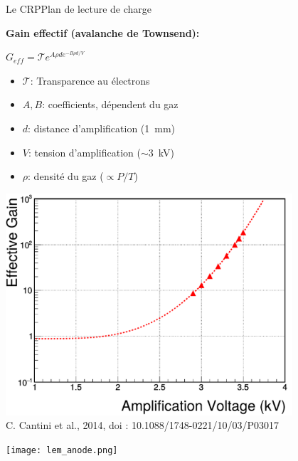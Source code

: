     \begin{frame}{Le CRP}{Plan de lecture de charge}
   		\begin{minipage}{0.43\textwidth}
   			\begin{scriptsize}
	   			\textbf{Gain effectif (avalanche de Townsend):}\\
	   		\end{scriptsize}
   			$G_{eff} = \mathcal{T}e^{A\rho d e^{-B\rho d/V}}$\\
   			\begin{scriptsize}
    			\begin{itemize}
    				\item $\mathcal{T}$: Transparence au électrons
    				\item $A,B$: coefficients, dépendent du gaz
    				\item $d$: distance d'amplification (\SI{1}{\milli\meter})
    				\item $V$: tension d'amplification ($\sim$\SI{3}{\kilo\volt})
    				\item $\rho$: densité du gaz ($\propto P/T$)
    			\end{itemize}
    		\end{scriptsize} 
   			\vfill\centering\includegraphics[width=0.8\textwidth]{./pictures/gain_3L.pdf}\\\tiny{C. Cantini et al., 2014, doi : 10.1088/1748-0221/10/03/P03017}
   		\end{minipage}\hfill
   		\begin{minipage}{0.52\textwidth}
   			\texttt{[image: lem\_anode.png]}
   		\end{minipage}
    \end{frame}
    

